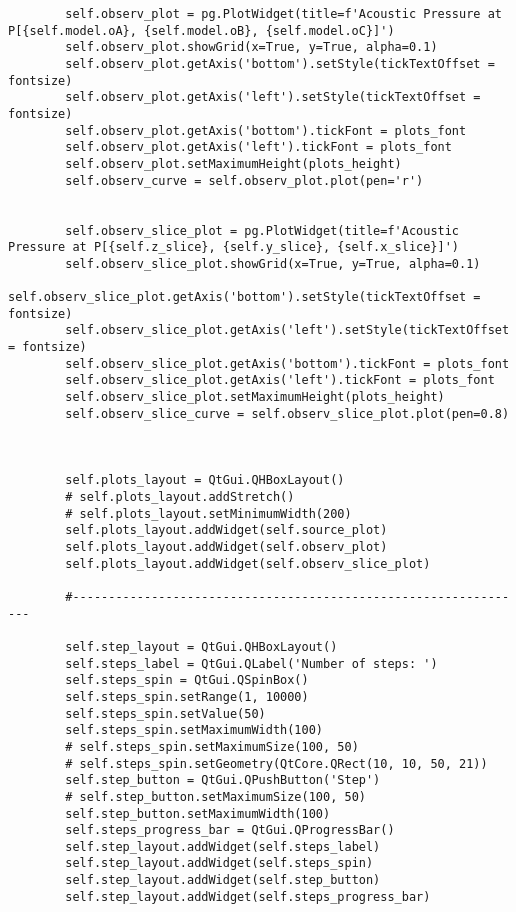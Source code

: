 \documentclass[../main.tex]{subfiles}
\begin{document}
\begin{lstlisting}
        self.observ_plot = pg.PlotWidget(title=f'Acoustic Pressure at P[{self.model.oA}, {self.model.oB}, {self.model.oC}]')
        self.observ_plot.showGrid(x=True, y=True, alpha=0.1)
        self.observ_plot.getAxis('bottom').setStyle(tickTextOffset = fontsize)
        self.observ_plot.getAxis('left').setStyle(tickTextOffset = fontsize)
        self.observ_plot.getAxis('bottom').tickFont = plots_font
        self.observ_plot.getAxis('left').tickFont = plots_font
        self.observ_plot.setMaximumHeight(plots_height)
        self.observ_curve = self.observ_plot.plot(pen='r')


        self.observ_slice_plot = pg.PlotWidget(title=f'Acoustic Pressure at P[{self.z_slice}, {self.y_slice}, {self.x_slice}]')
        self.observ_slice_plot.showGrid(x=True, y=True, alpha=0.1)
        self.observ_slice_plot.getAxis('bottom').setStyle(tickTextOffset = fontsize)
        self.observ_slice_plot.getAxis('left').setStyle(tickTextOffset = fontsize)
        self.observ_slice_plot.getAxis('bottom').tickFont = plots_font
        self.observ_slice_plot.getAxis('left').tickFont = plots_font
        self.observ_slice_plot.setMaximumHeight(plots_height)
        self.observ_slice_curve = self.observ_slice_plot.plot(pen=0.8)



        self.plots_layout = QtGui.QHBoxLayout()
        # self.plots_layout.addStretch()
        # self.plots_layout.setMinimumWidth(200)
        self.plots_layout.addWidget(self.source_plot)
        self.plots_layout.addWidget(self.observ_plot)
        self.plots_layout.addWidget(self.observ_slice_plot)

        #----------------------------------------------------------------

        self.step_layout = QtGui.QHBoxLayout()
        self.steps_label = QtGui.QLabel('Number of steps: ')
        self.steps_spin = QtGui.QSpinBox()
        self.steps_spin.setRange(1, 10000)
        self.steps_spin.setValue(50)
        self.steps_spin.setMaximumWidth(100)
        # self.steps_spin.setMaximumSize(100, 50)
        # self.steps_spin.setGeometry(QtCore.QRect(10, 10, 50, 21))
        self.step_button = QtGui.QPushButton('Step')
        # self.step_button.setMaximumSize(100, 50)
        self.step_button.setMaximumWidth(100)
        self.steps_progress_bar = QtGui.QProgressBar()
        self.step_layout.addWidget(self.steps_label)
        self.step_layout.addWidget(self.steps_spin)
        self.step_layout.addWidget(self.step_button)
        self.step_layout.addWidget(self.steps_progress_bar)
        




\end{lstlisting}
\end{document}
